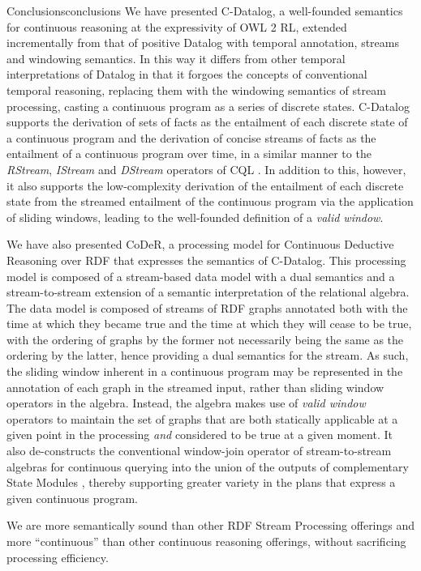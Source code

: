 \begin{nestedsection}{Conclusions}{conclusions}
	We have presented C-Datalog, a well-founded semantics for continuous reasoning at the expressivity of OWL 2 RL, extended incrementally from that of positive Datalog with temporal annotation, streams and windowing semantics.
	In this way it differs from other temporal interpretations of Datalog \citep{TODO} in that it forgoes the concepts of conventional temporal reasoning, replacing them with the windowing semantics of stream processing, casting a continuous program as a series of discrete states.
	C-Datalog supports the derivation of sets of facts as the entailment of each discrete state of a continuous program and the derivation of concise streams of facts as the entailment of a continuous program over time, in a similar manner to the \emph{RStream}, \emph{IStream} and \emph{DStream} operators of CQL \citep{CQL}.
	In addition to this, however, it also supports the low-complexity derivation of the entailment of each discrete state from the streamed entailment of the continuous program via the application of sliding windows, leading to the well-founded definition of a \emph{valid window}.

	We have also presented CoDeR, a processing model for Continuous Deductive Reasoning over RDF that expresses the semantics of C-Datalog.
	This processing model is composed of a stream-based data model with a dual semantics and a stream-to-stream extension of a semantic interpretation of the relational algebra.
	The data model is composed of streams of RDF graphs annotated both with the time at which they became true and the time at which they will cease to be true, with the ordering of graphs by the former not necessarily being the same as the ordering by the latter, hence providing a dual semantics for the stream.
	As such, the sliding window inherent in a continuous program may be represented in the annotation of each graph in the streamed input, rather than sliding window operators in the algebra.
	Instead, the algebra makes use of \emph{valid window} operators to maintain the set of graphs that are both statically applicable at a given point in the processing \emph{and} considered to be true at a given moment.
	It also de-constructs the conventional window-join operator of stream-to-stream algebras for continuous querying into the union of the outputs of complementary State Modules \citep{SteMs}, thereby supporting greater variety in the plans that express a given continuous program.

	We are more semantically sound than other RDF Stream Processing offerings and more ``continuous'' than other continuous reasoning offerings, without sacrificing processing efficiency.

\end{nestedsection}